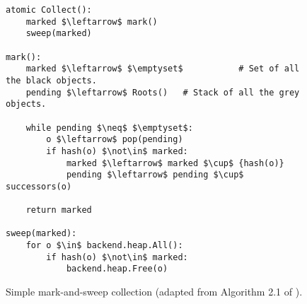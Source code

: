 \begin{figure}[!ht]
  \caption{Simple mark-and-sweep collection (adapted from Algorithm 2.1 of \cite{handbook}).}
  \label{alg:mark-sweep}

  \vspace{-.5em}
  \centering
  \begin{lstlisting}
atomic Collect():
    marked $\leftarrow$ mark()
    sweep(marked)

mark():
    marked $\leftarrow$ $\emptyset$           # Set of all the black objects.
    pending $\leftarrow$ Roots()   # Stack of all the grey objects.

    while pending $\neq$ $\emptyset$:
        o $\leftarrow$ pop(pending)
        if hash(o) $\not\in$ marked:
            marked $\leftarrow$ marked $\cup$ {hash(o)}
            pending $\leftarrow$ pending $\cup$ successors(o)

    return marked

sweep(marked):
    for o $\in$ backend.heap.All():
        if hash(o) $\not\in$ marked:
            backend.heap.Free(o)
\end{lstlisting}
\end{figure}
